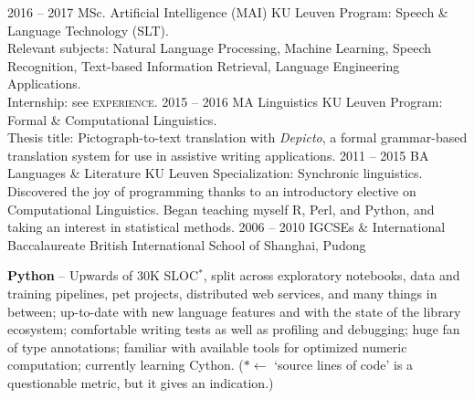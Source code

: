 \documentclass[9pt]{developercv} %
\begin{document}
\vspace{-1em}



\begin{entrylist}
	\entry
		{2016 -- 2017}
        {MSc. Artificial Intelligence (MAI)}
		{KU Leuven}
        {Program: Speech \& Language Technology (SLT).\\
         Relevant subjects: Natural Language Processing, Machine Learning, 
         Speech Recognition, Text-based Information Retrieval, Language Engineering Applications.\\
         Internship: see \textsc{experience}.}
	\entry
		{2015 -- 2016}
        {MA Linguistics}
		{KU Leuven}
        {Program: Formal \& Computational Linguistics.\\
         Thesis title: Pictograph-to-text translation with \textit{Depicto}, a formal grammar-based
         translation system for use in assistive writing applications.}
	\entry
		{2011 -- 2015}
        {BA Languages \& Literature}
        {KU Leuven}
        {Specialization: Synchronic linguistics.\\
         Discovered the joy of programming thanks to an introductory elective on 
         Computational Linguistics. Began teaching myself R, Perl, and Python, and taking an
         interest in statistical methods.}
    \entry
        {2006 -- 2010}
        {IGCSEs \& International Baccalaureate}
        {British International School of Shanghai, Pudong}
        {}
\end{entrylist}

\vspace{-2em}


\textbf{Python} -- Upwards of 30K SLOC$^*$, split across exploratory notebooks,
data and training pipelines, pet projects, distributed web services, and many
things in between; up-to-date with new language features and with the state of
the library ecosystem; comfortable writing tests as well as profiling and
debugging; huge fan of type annotations; familiar with available tools for
optimized numeric computation; currently learning Cython. ($* \leftarrow$
`source lines of code' is a questionable metric, but it gives an
indication.)\\
\end{document}
